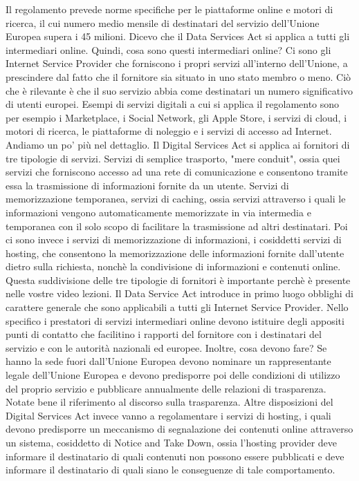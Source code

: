 Il regolamento prevede norme specifiche per le piattaforme online e motori di ricerca, il cui numero medio mensile di destinatari del servizio dell'Unione Europea supera i 45 milioni.
Dicevo che il Data Services Act si applica a tutti gli intermediari online.
Quindi, cosa sono questi intermediari online?
Ci sono gli Internet Service Provider che forniscono i propri servizi all'interno dell'Unione, a prescindere dal fatto che il fornitore sia situato in uno stato membro o meno.
Ciò che è rilevante è che il suo servizio abbia come destinatari un numero significativo di utenti europei.
Esempi di servizi digitali a cui si applica il regolamento sono per esempio i Marketplace, i Social Network, gli Apple Store, i servizi di cloud, i motori di ricerca, le piattaforme di noleggio e i servizi di accesso ad Internet.
Andiamo un po' più nel dettaglio.
Il Digital Services Act si applica ai fornitori di tre tipologie di servizi.
Servizi di semplice trasporto, "mere conduit", ossia quei servizi che forniscono accesso ad una rete di comunicazione e consentono tramite essa la trasmissione di informazioni fornite da un utente.
Servizi di memorizzazione temporanea, servizi di caching, ossia servizi attraverso i quali le informazioni vengono automaticamente memorizzate in via intermedia e temporanea con il solo scopo di facilitare la trasmissione ad altri destinatari.
Poi ci sono invece i servizi di memorizzazione di informazioni, i cosiddetti servizi di hosting, che consentono la memorizzazione delle informazioni fornite dall'utente dietro sulla richiesta, nonchè la condivisione di informazioni e contenuti online.
Questa suddivisione delle tre tipologie di fornitori è importante perchè è presente nelle vostre video lezioni.
Il Data Service Act introduce in primo luogo obblighi di carattere generale che sono applicabili a tutti gli Internet Service Provider.
Nello specifico i prestatori di servizi intermediari online devono istituire degli appositi punti di contatto che facilitino i rapporti del fornitore con i destinatari del servizio e con le autorità nazionali ed europee.
Inoltre, cosa devono fare?
Se hanno la sede fuori dall'Unione Europea devono nominare un rappresentante legale dell'Unione Europea e devono predisporre poi delle condizioni di utilizzo del proprio servizio e pubblicare annualmente delle relazioni di trasparenza.
Notate bene il riferimento al discorso sulla trasparenza.
Altre disposizioni del Digital Services Act invece vanno a regolamentare i servizi di hosting, i quali devono predisporre un meccanismo di segnalazione dei contenuti online attraverso un sistema, cosiddetto di Notice and Take Down, ossia l'hosting provider deve informare il destinatario di quali contenuti non possono essere pubblicati e deve informare il destinatario di quali siano le conseguenze di tale comportamento.
